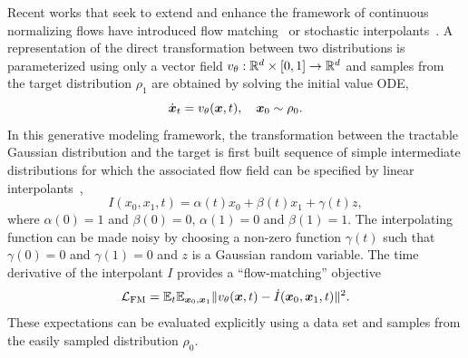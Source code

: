 \documentclass[11pt]{article}
\begin{document}
Recent works that seek to extend and enhance the framework of continuous normalizing flows have introduced flow matching~\cite{peluchetti_non-denoising_2022,peluchetti_diffusion_2023,lipman_flow_2022} or stochastic interpolants~\cite{albergo_building_2022, albergo_stochastic_2023}.
A representation of the direct transformation between two distributions is parameterized using only a vector field $v_{\theta}: \mathbb{R}^d\times[0,1]\to \mathbb{R}^d$ and samples from the target distribution $\rho_1$ are obtained by solving the initial value ODE,
\begin{equation}
    \dot {\boldsymbol{x}}_t = v_{\theta}(\boldsymbol{x},t), \quad \boldsymbol{x}_0 \sim \rho_0.
\end{equation}
In this generative modeling framework, the transformation between the tractable Gaussian distribution and the target is first built sequence of simple intermediate distributions for which the associated flow field can be specified by linear interpolants~\cite{lipman_flow_2022, albergo_building_2022}, 
\begin{equation}
    I(x_0, x_1, t) = \alpha(t) x_0 + \beta(t) x_1 + \gamma(t) z,
\end{equation}
where $\alpha(0)=1$ and $\beta(0)=0$, $\alpha(1)=0$ and $\beta(1)=1$.
The interpolating function can be made noisy by choosing a non-zero function $\gamma(t)$ such that $\gamma(0)=0$ and $\gamma(1)=0$ and $z$ is a Gaussian random variable.
The time derivative of the interpolant $I$ provides a ``flow-matching'' objective
\begin{equation}
    \mathcal{L}_{\rm FM} = \mathbb{E}_{t} \mathbb{E}_{\boldsymbol{x}_0, \boldsymbol{x}_1} \| v_\theta(\boldsymbol{x}, t) - \dot I(\boldsymbol{x}_0, \boldsymbol{x}_1, t) \|^2.
\end{equation}
These expectations can be evaluated explicitly using a data set and samples from the easily sampled distribution $\rho_0$.
\end{document}

